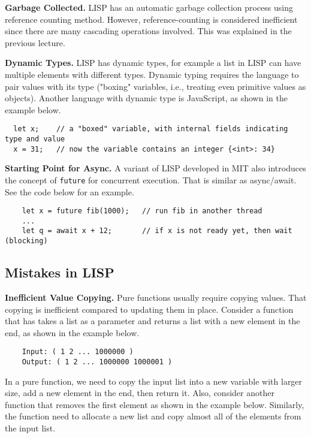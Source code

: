 \documentclass[twoside]{article}
\begin{document}
\textbf{Garbage Collected. } LISP has an automatic garbage collection process using reference counting method. However, reference-counting is considered inefficient since there are many cascading operations involved. This was explained in the previous lecture. 

\textbf{Dynamic Types. } LISP has dynamic types, for example a list in LISP can have multiple elements with different types. Dynamic typing requires the language to pair values with its type ("boxing" variables, i.e., treating even primitive values as objects). Another language with dynamic type is JavaScript, as shown in the example below.

\begin{verbatim}
  let x;    // a "boxed" variable, with internal fields indicating type and value
  x = 31;   // now the variable contains an integer {<int>: 34}
\end{verbatim}

\newpage
\textbf{Starting Point for Async. } A variant of LISP developed in MIT also introduces the concept of \verb|future| for concurrent execution. That is similar as async/await. See the code below for an example.

\begin{verbatim}
    let x = future fib(1000);   // run fib in another thread
    ...
    let q = await x + 12;       // if x is not ready yet, then wait (blocking)
\end{verbatim}

\subsection{Mistakes in LISP}

\textbf{Inefficient Value Copying.} 
Pure functions usually require copying values. That copying is inefficient compared to updating them in place. Consider a function that has takes a list as a parameter and returns a list with a new element in the end, as shown in the example below.

\begin{verbatim}
    Input: ( 1 2 ... 1000000 )
    Output: ( 1 2 ... 1000000 1000001 )
\end{verbatim}

In a pure function, we need to copy the input list into a new variable with larger size, add a new element in the end, then return it. Also, consider another function that removes the first element as shown in the example below. Similarly, the function need to allocate a new list and copy almost all of the elements from the input list.
\end{document}
